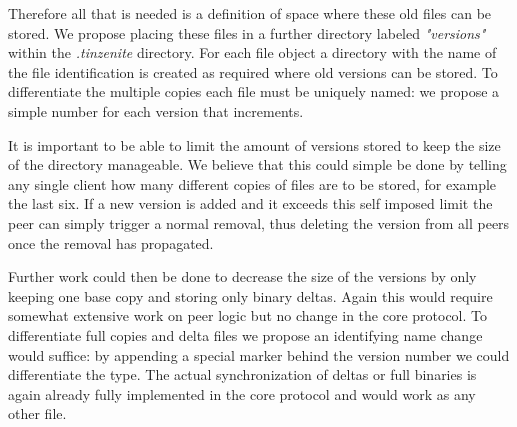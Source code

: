 Therefore all that is needed is a definition of space where these old files can be stored.
We propose placing these files in a further directory labeled \textit{"versions"} within the \textit{.tinzenite} directory.
For each file object a directory with the name of the file identification is created as required where old versions can be stored.
To differentiate the multiple copies each file must be uniquely named: we propose a simple number for each version that increments.

It is important to be able to limit the amount of versions stored to keep the size of the directory manageable.
We believe that this could simple be done by telling any single client how many different copies of files are to be stored, for example the last six.
If a new version is added and it exceeds this self imposed limit the peer can simply trigger a normal removal, thus deleting the version from all peers once the removal has propagated.

Further work could then be done to decrease the size of the versions by only keeping one base copy and storing only binary deltas.
Again this would require somewhat extensive work on peer logic but no change in the core protocol.
To differentiate full copies and delta files we propose an identifying name change would suffice: by appending a special marker behind the version number we could differentiate the type.
The actual synchronization of deltas or full binaries is again already fully implemented in the core protocol and would work as any other file.
